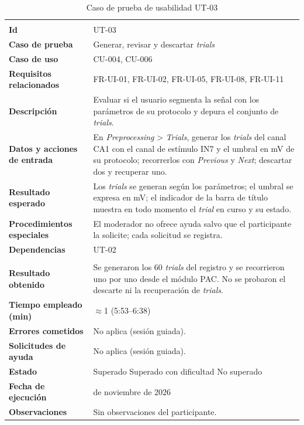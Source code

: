 \documentclass[12pt,letterpaper,oneside]{article}
\DeclareRobustCommand{\_}{\textunderscore\allowbreak}
\newcommand{\fechasesion}{12 de noviembre de 2026}
\newcommand{\casilla}[1]{%
    \fbox{\makebox[1em][c]{#1}}%
}
\begin{document}
\begin{center}
\small
\begin{longtable}{|>{\raggedright\arraybackslash}p{}|>{\raggedright\arraybackslash}p{}|}
\hline
\endfirsthead
\hline
\endhead
\hline
\endfoot
\hline
\caption{Caso de prueba de usabilidad UT-03} \label{tab:ut-03} \\
\endlastfoot
\textbf{Id} & UT-03 \\
\hline
\textbf{Caso de prueba} & Generar, revisar y descartar \textit{trials} \\
\hline
\textbf{Caso de uso} & CU-004, CU-006 \\
\hline
\textbf{Requisitos relacionados} & FR-UI-01, FR-UI-02, FR-UI-05, FR-UI-08, FR-UI-11 \\
\hline
\textbf{Descripción} & Evaluar si el usuario segmenta la señal con los parámetros de su protocolo y depura el conjunto de \textit{trials}. \\
\hline
\textbf{Datos y acciones de entrada} & En \textit{Preprocessing} > \textit{Trials}, generar los \textit{trials} del canal CA1 con el canal de estímulo IN7 y el umbral en mV de su protocolo; recorrerlos con \textit{Previous} y \textit{Next}; descartar dos y recuperar uno. \\
\hline
\textbf{Resultado esperado} & Los \textit{trials} se generan según los parámetros; el umbral se expresa en mV; el indicador de la barra de título muestra en todo momento el \textit{trial} en curso y su estado. \\
\hline
\textbf{Procedimientos especiales} & El moderador no ofrece ayuda salvo que el participante la solicite; cada solicitud se registra. \\
\hline
\textbf{Dependencias} & UT-02 \\
\hline
\multicolumn{2}{|c|}{\textbf{Información para el seguimiento}} \\
\hline
\textbf{Resultado obtenido} & Se generaron los 60 \textit{trials} del registro y se recorrieron uno por uno desde el módulo PAC. No se probaron el descarte ni la recuperación de \textit{trials}. \\
\hline
\textbf{Tiempo empleado (min)} & $\approx$1 (5:53--6:38) \\
\hline
\textbf{Errores cometidos} & No aplica (sesión guiada). \\
\hline
\textbf{Solicitudes de ayuda} & No aplica (sesión guiada). \\
\hline
\textbf{Estado} & \casilla{x} Superado \qquad \casilla{} Superado con dificultad \qquad \casilla{} No superado \\
\hline
\textbf{Fecha de ejecución} & \fechasesion \\
\hline
\textbf{Observaciones} & Sin observaciones del participante. \\
\hline
\end{longtable}
\end{center}
\end{document}
